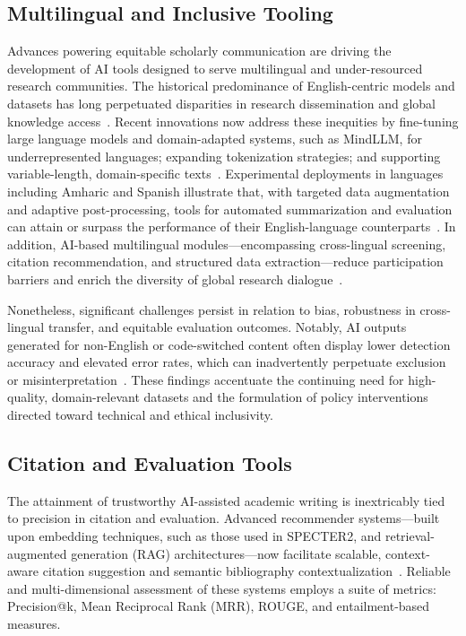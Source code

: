 \documentclass[11pt]{article}
\begin{document}
\subsection{Multilingual and Inclusive Tooling}

Advances powering equitable scholarly communication are driving the development of AI tools designed to serve multilingual and under-resourced research communities. The historical predominance of English-centric models and datasets has long perpetuated disparities in research dissemination and global knowledge access~\cite{90,93,97,98,100,104,105,110}. Recent innovations now address these inequities by fine-tuning large language models and domain-adapted systems, such as MindLLM, for underrepresented languages; expanding tokenization strategies; and supporting variable-length, domain-specific texts~\cite{90,97,100,105,110}. Experimental deployments in languages including Amharic and Spanish illustrate that, with targeted data augmentation and adaptive post-processing, tools for automated summarization and evaluation can attain or surpass the performance of their English-language counterparts~\cite{93,97,98,104,110}. In addition, AI-based multilingual modules—encompassing cross-lingual screening, citation recommendation, and structured data extraction—reduce participation barriers and enrich the diversity of global research dialogue~\cite{90,93,98,105}.

Nonetheless, significant challenges persist in relation to bias, robustness in cross-lingual transfer, and equitable evaluation outcomes. Notably, AI outputs generated for non-English or code-switched content often display lower detection accuracy and elevated error rates, which can inadvertently perpetuate exclusion or misinterpretation~\cite{90,93,98,105,110}. These findings accentuate the continuing need for high-quality, domain-relevant datasets and the formulation of policy interventions directed toward technical and ethical inclusivity.

\subsection{Citation and Evaluation Tools}

The attainment of trustworthy AI-assisted academic writing is inextricably tied to precision in citation and evaluation. Advanced recommender systems—built upon embedding techniques, such as those used in SPECTER2, and retrieval-augmented generation (RAG) architectures—now facilitate scalable, context-aware citation suggestion and semantic bibliography contextualization~\cite{107}. Reliable and multi-dimensional assessment of these systems employs a suite of metrics: Precision@k, Mean Reciprocal Rank (MRR), ROUGE, and entailment-based measures.
\end{document}
